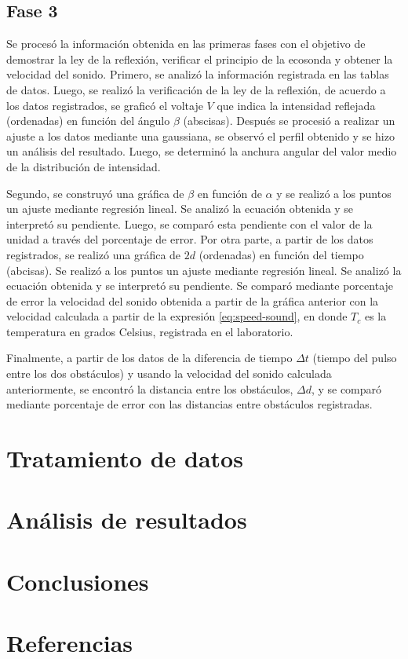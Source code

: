 \documentclass[spanish,notitlepage,letterpaper, 12pt]{article}
\begin{document}
\subsection{Fase 3}
Se procesó la información obtenida en las primeras fases con el objetivo de
demostrar la ley de la reflexión, verificar el principio de la ecosonda y obtener la velocidad
del sonido. Primero, se analizó la información registrada en las tablas de datos. Luego,
se realizó la verificación de la ley de la reflexión, de acuerdo a los datos registrados, se graficó el voltaje $V$ que indica la intensidad reflejada (ordenadas) en función
del ángulo $\beta$ (abscisas). Después se procesió a realizar un ajuste a los datos mediante
una gaussiana, se observó el perfil obtenido y se hizo un análisis del resultado. Luego,
se determinó la anchura angular del valor medio de la distribución de intensidad.\par
\bigskip
Segundo, se construyó una gráfica de $\beta$ en función de $\alpha$ y se
realizó a los puntos un ajuste mediante regresión lineal. Se analizó la ecuación obtenida
y se interpretó su pendiente. Luego, se comparó esta pendiente con el valor de la unidad
a través del porcentaje de error.
Por otra parte, a partir de los datos registrados, se realizó una gráfica de $2d$
(ordenadas) en función del tiempo (abcisas). Se realizó a los puntos un ajuste mediante
regresión lineal. Se analizó la ecuación obtenida y se interpretó su pendiente. Se
comparó mediante porcentaje de error la velocidad del sonido obtenida a partir de la
gráfica anterior con la velocidad calculada a partir de la expresión \eqref{eq:speed-sound}, en
donde $T_c$ es la temperatura en grados Celsius, registrada en el laboratorio.\par
\bigskip
Finalmente, a partir de los datos de la diferencia de tiempo $\Delta t$ (tiempo del pulso entre los
dos obstáculos) y usando la velocidad del sonido calculada anteriormente, se encontró la
distancia entre los obstáculos, $\Delta d$, y se comparó mediante porcentaje de error con las
distancias entre obstáculos registradas.
\section{Tratamiento de datos} \label{TD}
\section{Análisis de resultados}
\section{Conclusiones}
\section{Referencias} 


\end{document}
